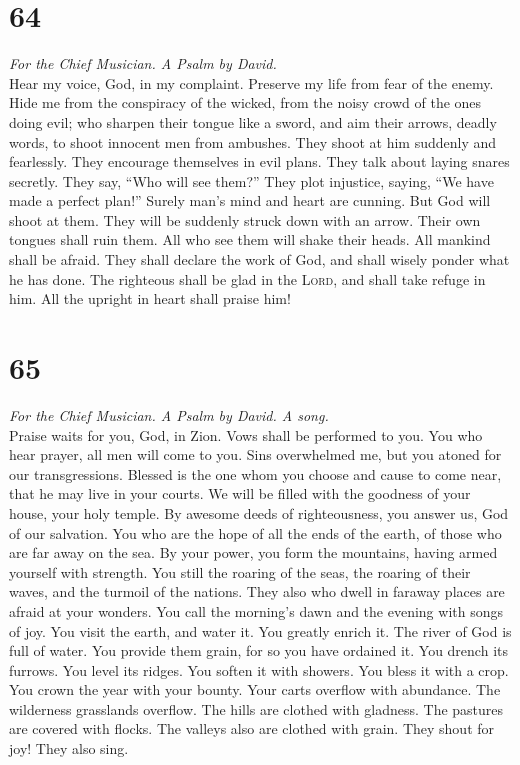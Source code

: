 \hypertarget{section-63}{%
\section{64}\label{section-63}}

\emph{For the Chief Musician. A Psalm by David.}\\
 Hear my voice, God, in my complaint. Preserve my life
from fear of the enemy.  Hide me from the conspiracy of
the wicked, from the noisy crowd of the ones doing evil; 
who sharpen their tongue like a sword, and aim their arrows, deadly
words,  to shoot innocent men from ambushes. They shoot at
him suddenly and fearlessly.  They encourage themselves in
evil plans. They talk about laying snares secretly. They say, ``Who will
see them?''  They plot injustice, saying, ``We have made a
perfect plan!'' Surely man's mind and heart are cunning. 
But God will shoot at them. They will be suddenly struck down with an
arrow.  Their own tongues shall ruin them. All who see
them will shake their heads.  All mankind shall be afraid.
They shall declare the work of God, and shall wisely ponder what he has
done.  The righteous shall be glad in the \textsc{Lord},
and shall take refuge in him. All the upright in heart shall praise him!

\hypertarget{section-64}{%
\section{65}\label{section-64}}

\emph{For the Chief Musician. A Psalm by David. A song.}\\
 Praise waits for you, God, in Zion. Vows shall be
performed to you.  You who hear prayer, all men will come
to you.  Sins overwhelmed me, but you atoned for our
transgressions.  Blessed is the one whom you choose and
cause to come near, that he may live in your courts. We will be filled
with the goodness of your house, your holy temple.  By
awesome deeds of righteousness, you answer us, God of our salvation. You
who are the hope of all the ends of the earth, of those who are far away
on the sea.  By your power, you form the mountains, having
armed yourself with strength.  You still the roaring of
the seas, the roaring of their waves, and the turmoil of the nations.
 They also who dwell in faraway places are afraid at your
wonders. You call the morning's dawn and the evening with songs of joy.
 You visit the earth, and water it. You greatly enrich it.
The river of God is full of water. You provide them grain, for so you
have ordained it.  You drench its furrows. You level its
ridges. You soften it with showers. You bless it with a crop.
 You crown the year with your bounty. Your carts overflow
with abundance.  The wilderness grasslands overflow. The
hills are clothed with gladness.  The pastures are
covered with flocks. The valleys also are clothed with grain. They shout
for joy! They also sing.

